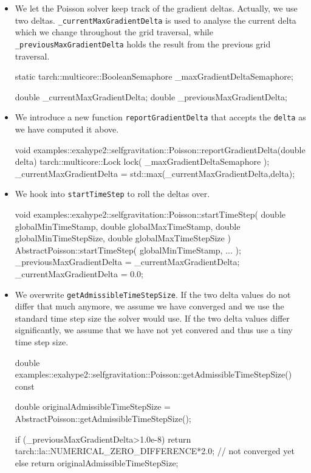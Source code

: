 \begin{itemize}
  \item We let the Poisson solver keep track of the gradient deltas. Actually,
  we use two deltas. \texttt{\_currentMaxGradientDelta} is used to analyse the
  current delta which we change throughout the grid traversal, while
  \texttt{\_previousMaxGradientDelta} holds the result from the previous grid
  traversal. 
  \begin{code}
    static tarch::multicore::BooleanSemaphore _maxGradientDeltaSemaphore;

    double _currentMaxGradientDelta;
    double _previousMaxGradientDelta;
  \end{code}
  \item We introduce a new function \texttt{reportGradientDelta} that accepts
  the \texttt{delta} as we have computed it above.
  \begin{code}
void examples::exahype2::selfgravitation::Poisson::reportGradientDelta(double delta) {
  tarch::multicore::Lock lock( _maxGradientDeltaSemaphore );
  _currentMaxGradientDelta = std::max(_currentMaxGradientDelta,delta);
}
  \end{code}
  \item We hook into \texttt{startTimeStep} to roll the deltas over.
  \begin{code}
void examples::exahype2::selfgravitation::Poisson::startTimeStep(
  double globalMinTimeStamp,
  double globalMaxTimeStamp,
  double globalMinTimeStepSize,
  double globalMaxTimeStepSize
) {
  AbstractPoisson::startTimeStep( globalMinTimeStamp, ... );
  _previousMaxGradientDelta = _currentMaxGradientDelta;
  _currentMaxGradientDelta = 0.0;
}
  \end{code}
  \item We overwrite \texttt{getAdmissibleTimeStepSize}. If the two delta values
  do not differ that much anymore, we assume we have converged and we use the
  standard time step size the solver would use. If the two delta values differ
  significantly, we assume that we have not yet convered and thus use a tiny
  time step size.
  \begin{code}
double examples::exahype2::selfgravitation::Poisson::getAdmissibleTimeStepSize() const {
  double originalAdmissibleTimeStepSize = AbstractPoisson::getAdmissibleTimeStepSize();

  if (_previousMaxGradientDelta>1.0e-8) {
    return tarch::la::NUMERICAL_ZERO_DIFFERENCE*2.0; // not converged yet
  }
  else {
    return originalAdmissibleTimeStepSize;
  }
}
  \end{code}
\end{itemize}





